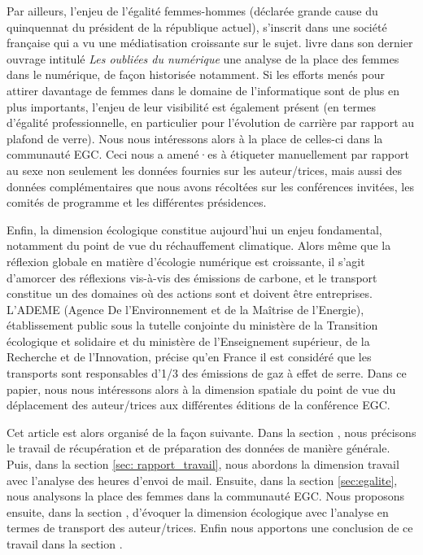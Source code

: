 \documentclass[a4paper,french]{rnti}
\begin{document}
Par ailleurs, l’enjeu de l’égalité femmes-hommes (déclarée grande cause du 
quinquennat du président de la république actuel), s’inscrit dans une 
société française qui a vu une médiatisation croissante sur le sujet. 
\cite{collet19book} livre dans son dernier ouvrage intitulé \textit{Les 
oubliées du numérique} une analyse de la place des femmes dans le 
numérique, de façon historisée notamment. Si les efforts menés pour 
attirer davantage de femmes dans le domaine de l’informatique sont de plus 
en plus importants, l’enjeu de leur visibilité est également présent (en 
termes d'égalité professionnelle, en particulier pour l'évolution de 
carrière par rapport au plafond de verre). Nous nous intéressons alors à 
la place de celles-ci dans la communauté EGC. Ceci nous a amené·es à 
étiqueter manuellement par rapport au sexe non seulement les données 
fournies sur les auteur/trices, mais aussi des données complémentaires que 
nous avons récoltées sur les conférences invitées, les comités de 
programme et les différentes présidences.


Enfin, la dimension écologique constitue aujourd’hui un enjeu fondamental, 
notamment du point de vue du réchauffement climatique. Alors même que la 
réflexion globale en matière d’écologie numérique est croissante, il 
s’agit d’amorcer des réflexions vis-à-vis des émissions de carbone, et le 
transport constitue un des domaines où des actions sont et doivent être 
entreprises. L'ADEME (Agence De l’Environnement et de la Maîtrise de 
l’Energie), établissement public sous la tutelle conjointe du ministère de 
la Transition écologique et solidaire et du ministère de l’Enseignement 
supérieur, de la Recherche et de l’Innovation, précise qu'en France il est 
considéré que les transports sont responsables d’1/3 des émissions de gaz 
à effet de serre. Dans ce papier, nous nous intéressons alors à la 
dimension spatiale du point de vue du déplacement des auteur/trices aux 
différentes éditions de la conférence EGC. 

Cet article est alors organisé de la façon suivante. Dans la section , 
nous précisons le travail de récupération et de préparation des données de 
manière générale. Puis, dans la section \ref{sec: rapport_travail}, nous 
abordons la dimension travail avec l'analyse des heures d'envoi de mail. 
Ensuite, dans la section \ref{sec:egalite}, nous analysons la place des 
femmes dans la communauté EGC. Nous proposons ensuite, dans la section , 
d'évoquer la dimension écologique avec l'analyse en termes de transport 
des auteur/trices. Enfin nous apportons une conclusion de ce travail dans 
la section .
\end{document}
